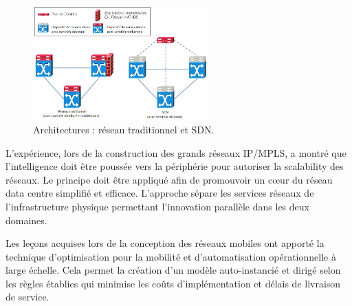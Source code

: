 \begin{figure}[h]
\begin{center}
\includegraphics[width=0.6\textwidth]{images/TraditionalVsSDN} 
\caption{Architectures : réseau traditionnel et SDN. \cite{SurveySDNArchi}} \label{TraditionalVsSDN}
\end{center}
\end{figure}


L'expérience, lors de la construction des grands réseaux IP/MPLS, a montré que l'intelligence doit être poussée vers la périphérie pour autoriser la \gls{scalability} des réseaux. Le principe doit être appliqué afin de promouvoir un cœur du réseau data centre simplifié et efficace. L'approche sépare les services réseaux de l'infrastructure physique permettant l'innovation parallèle dans les deux domaines.


Les leçons acquises lors de la conception des réseaux mobiles ont apporté la technique d'optimisation pour la mobilité et d'automatisation opérationnelle à large échelle. Cela permet la création d'un modèle auto-instancié et dirigé selon les règles établies qui minimise les coûts d'implémentation et délais de livraison de service.

